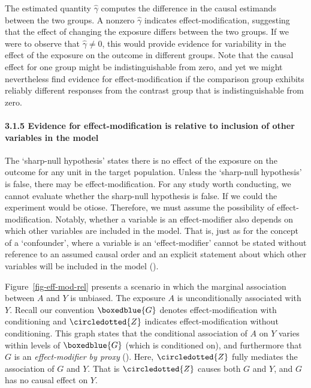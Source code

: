 \documentclass[
  singlecolumn]{article}
\let\oldparagraph\paragraph
\renewcommand{\paragraph}[1]{\oldparagraph{#1}\mbox{}}
\begin{document}
The estimated quantity \(\hat{\gamma}\) computes the difference in the
causal estimands between the two groups. A nonzero \(\hat{\gamma}\)
indicates effect-modification, suggesting that the effect of changing
the exposure differs between the two groups. If we were to observe that
\(\hat{\gamma} \neq 0\), this would provide evidence for variability in
the effect of the exposure on the outcome in different groups. Note that
the causal effect for one group might be indistinguishable from zero,
and yet we might nevertheless find evidence for effect-modification if
the comparison group exhibits reliably different responses from the
contrast group that is indistinguishable from zero.

\paragraph{3.1.5 Evidence for effect-modification is relative to
inclusion of other variables in the
model}\label{evidence-for-effect-modification-is-relative-to-inclusion-of-other-variables-in-the-model}

The `sharp-null hypothesis' states there is no effect of the exposure on
the outcome for any unit in the target population. Unless the
`sharp-null hypothesis' is false, there may be effect-modification. For
any study worth conducting, we cannot evaluate whether the sharp-null
hypothesis is false. If we could the experiment would be otiose.
Therefore, we must assume the possibility of effect-modification.
Notably, whether a variable is an effect-modifier also depends on which
other variables are included in the model. That is, just as for the
concept of a `confounder', where a variable is an `effect-modifier'
cannot be stated without reference to an assumed causal order and an
explicit statement about which other variables will be included in the
model ().

Figure~\ref{fig-eff-mod-rel} presents a scenario in which the marginal
association between \(A\) and \(Y\) is unbiased. The exposure \(A\) is
unconditionally associated with \(Y\). Recall our convention
\(\boxedblue{G}\) denotes effect-modification with conditioning and
\(\circledotted{Z}\) indicates effect-modification without conditioning.
This graph states that the conditional association of \(A\) on \(Y\)
varies within levels of \(\boxedblue{G}\) (which is conditioned on), and
furthermore that \(G\) is an \emph{effect-modifier by proxy}
(). Here,
\(\circledotted{Z}\) fully mediates the association of \(G\) and \(Y\).
That is \(\circledotted{Z}\) causes both \(G\) and \(Y\), and \(G\) has
no causal effect on \(Y\).
\end{document}
